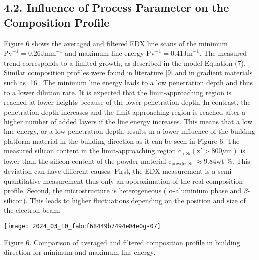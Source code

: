 \documentclass[10pt]{article}
\begin{document}
\subsection*{4.2. Influence of Process Parameter on the Composition Profile}
Figure 6 shows the averaged and filtered EDX line scans of the minimum $\mathrm{Pv}^{-1}=0.26 \mathrm{Jmm}^{-1}$ and maximum line energy $\mathrm{Pv}^{-1}=0.41 \mathrm{Jm}^{-1}$. The measured trend corresponds to a limited growth, as described in the model Equation (7). Similar composition profiles were found in literature [9] and in gradient materials such as [16]. The minimum line energy leads to a low penetration depth and thus to a lower dilution rate. It is expected that the limit-approaching region is reached at lower heights because of the lower penetration depth. In contrast, the penetration depth increases and the limit-approaching region is reached after a higher number of added layers if the line energy increases. This means that a low line energy, or a low penetration depth, results in a lower influence of the building platform material in the building direction as it can be seen in Figure 6. The measured silicon content in the limit-approaching region $\mathrm{c}_{\mathrm{n}, \mathrm{Si}}(\mathrm{z} \prime>800 \mu \mathrm{m})$ is lower than the silicon content of the powder material $\mathrm{c}_{\text {powder,Si }} \approx 9.84 \mathrm{wt}$ \%. This deviation can have different causes. First, the EDX measurement is a semi-quantitative measurement thus only an approximation of the real composition profile. Second, the microstructure is heterogeneous ( $\alpha$-aluminium phase and $\beta$-silicon). This leads to higher fluctuations depending on the position and size of the electron beam.

\begin{center}
\texttt{[image: 2024\_03\_10\_fabcf68449b7494e04e0g-07]}
\end{center}

Figure 6. Comparison of averaged and filtered composition profile in building direction for minimum and maximum line energy.
\end{document}
